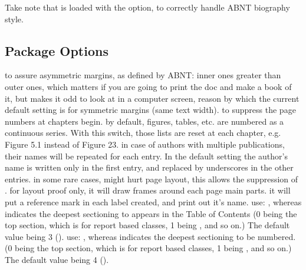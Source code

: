\documentclass[dctools,english]{ufrgscca} %
\begin{document}
Take note that  is loaded with the \textbf{} option, to correctly handle ABNT biography style.

\subsection{Package Options}
\begin{Options}
	 to assure asymmetric margins, as defined by ABNT: inner ones greater than outer ones, which matters if you are going to print the doc and make a book of it, but makes it odd to look at in a computer screen, reason by which the current default setting is for symmetric margins (same text width).
	 to suppress the page numbers at chapters begin.
	 by default, figures, tables, etc. are numbered as a continuous series. With this switch, those lists are reset at each chapter, e.g. Figure 5.1 instead of Figure 23.
	 in case of authors with multiple publications, their names will be repeated for each entry. In the default setting the author's name is written only in the first entry, and replaced by underscores in the other entries.
	 in some rare cases,  might hurt page layout, this allows the suppression of .
	 for layout proof only, it will draw frames around each page main parts.
	 it will put a reference mark in each label created, and print out it's name.
	 use: , whereas  indicates the deepest sectioning to appears in the Table of Contents (0 being the top section, which is \Macro{\chapter}{} for report based classes, 1 being \Macro{\section}{}, and so on.) The default value being 3 (\Macro{\subsubsection}{}).
	 use: , whereas  indicates the deepest sectioning to be numbered. (0 being the top section, which is \Macro{\chapter}{} for report based classes, 1 being \Macro{\section}{}, and so on.) The default value being 4 (\Macro{\paragraph}{}).

\end{Options}
\end{document}
